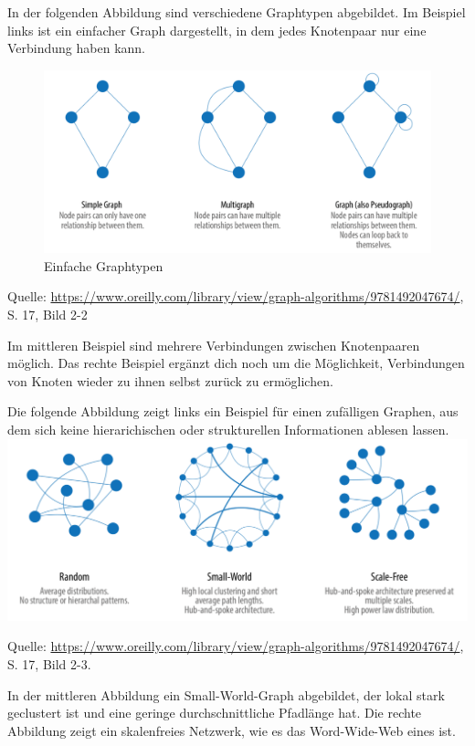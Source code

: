 \documentclass[12pt,ngerman,]{article}
\begin{document}
In der folgenden Abbildung sind verschiedene Graphtypen abgebildet. Im
Beispiel links ist ein einfacher Graph dargestellt, in dem jedes
Knotenpaar nur eine Verbindung haben kann.

\begin{figure}
\centering
\includegraphics{Bilder/Graph-Algorithms/17-2-2-TypesOfGraphs.png}
\caption{Einfache Graphtypen}
\end{figure}

Quelle:
\href{Needham/Hodler\%202019}{https://www.oreilly.com/library/view/graph-algorithms/9781492047674/},
S. 17, Bild 2-2

Im mittleren Beispiel sind mehrere Verbindungen zwischen Knotenpaaren
möglich. Das rechte Beispiel ergänzt dich noch um die Möglichkeit,
Verbindungen von Knoten wieder zu ihnen selbst zurück zu ermöglichen.

Die folgende Abbildung zeigt links ein Beispiel für einen zufälligen
Graphen, aus dem sich keine hierarichischen oder strukturellen
Informationen ablesen lassen.
\includegraphics{Bilder/Graph-Algorithms/17-2-3-RandomSmallWorldScaleFree.png}

Quelle:
\href{Needham/Hodler\%202019}{https://www.oreilly.com/library/view/graph-algorithms/9781492047674/},
S. 17, Bild 2-3.

In der mittleren Abbildung ein Small-World-Graph abgebildet, der lokal
stark geclustert ist und eine geringe durchschnittliche Pfadlänge hat.
Die rechte Abbildung zeigt ein skalenfreies Netzwerk, wie es das
Word-Wide-Web eines ist.
\end{document}
